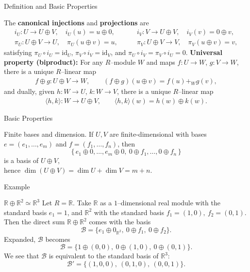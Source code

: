 \begin{frame}{Definition and Basic Properties}
\begin{block}{}
The \textbf{canonical injections} and \textbf{projections} are
\small\begin{align*}
i_U:U\to U\oplus V,\quad i_U(u)=u\oplus 0, \qquad &
i_V:V\to U\oplus V,\quad i_V(v)=0\oplus v,\\
\pi_U:U\oplus V\to U,\quad \pi_U(u\oplus v)=u, \qquad &
\pi_V:U\oplus V\to V,\quad \pi_V(u\oplus v)=v,
\end{align*}
satisfying $\pi_U\circ i_U=\mathrm{id}_U$, $\pi_V\circ i_V=\mathrm{id}_V$, and $\pi_U\circ i_V=\pi_V\circ i_U=0$.
\textbf{Universal property (biproduct):} For any $R$–module $W$ and maps $f:U\to W$, $g:V\to W$, there is a unique $R$–linear map
\begin{align*}
f\oplus g:U\oplus V\to W,\qquad (f\oplus g)(u\oplus v)=f(u)+_W g(v),
\end{align*}
and dually, given $h:W\to U$, $k:W\to V$, there is a unique $R$–linear map
\begin{align*}
\langle h,k\rangle:W\to U\oplus V,\qquad \langle h,k\rangle(w)=h(w)\oplus k(w).
\end{align*}
\end{block}
\end{frame}

\begin{frame}{Basic Properties}
\begin{block}{Finite bases and dimension.} If $U,V$ are finite-dimensional with bases $e=(e_1,\dots,e_m)$ and $f=(f_1,\dots,f_n)$, then
\[
\{\,e_1\oplus 0,\dots, e_m\oplus 0,\ 0\oplus f_1,\dots,0\oplus f_n\,\}
\]
is a basis of $U\oplus V$, \\
hence $\dim(U\oplus V)=\dim U+\dim V=m+n$.
\end{block}
\end{frame}

\begin{frame}{Example}
\vspace{-0.3cm}
\begin{block}{$\mathbb{R} \oplus \mathbb{R}^2 \simeq \mathbb{R}^3$}
Let $R=\mathbb{R}$.
Take $\mathbb{R}$ as a $1$–dimensional real module with the standard basis $e_1 = 1$,
and $\mathbb{R}^2$ with the standard basis $f_1 = (1, 0),\ f_2 = (0, 1).$
Then the direct sum $\mathbb{R} \oplus \mathbb{R}^2$ comes with the basis
\[
\mathcal{B} = \{e_1 \oplus 0_{\mathbb{R}^2},\ 0 \oplus f_1,\ 0 \oplus f_2\}.
\]
Expanded, $\mathcal{B}$ becomes
\[
\mathcal{B} = \{1 \oplus (0, 0),\ 0 \oplus (1, 0),\ 0 \oplus (0, 1)\}.
\]
We see that $\mathcal{B}$ is equivalent to the standard basis of $\mathbb{R}^3$:
\[
\mathcal{B}' = \{(1, 0, 0),\ (0, 1, 0),\ (0, 0, 1)\}.
\]
\end{block}
\end{frame}


